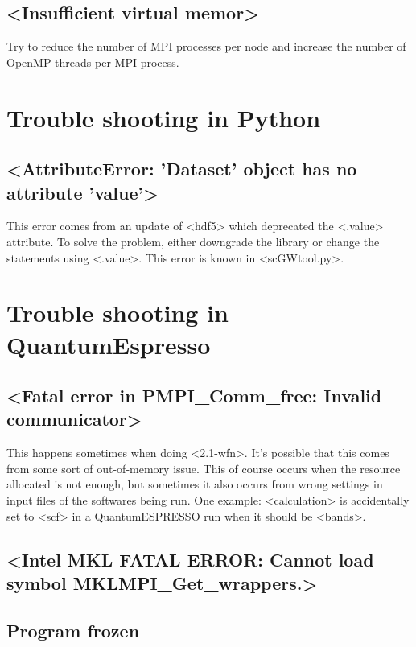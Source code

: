 \documentclass[hyperref, a4paper, 12pt]{report}
\def\texttt#1{<#1>}%
\newcommand{\shortcode}[1]{\texttt{#1}}
\begin{document}
\subsection{\shortcode{Insufficient virtual memor}}

Try to reduce the number of MPI processes per node 
and increase the number of OpenMP threads per MPI process.


\section{Trouble shooting in Python}

\subsection{\shortcode{AttributeError: 'Dataset' object has no attribute 'value'}}

This error comes from an update of \shortcode{hdf5} 
which deprecated the \shortcode{.value} attribute.
To solve the problem, 
either downgrade the library 
or change the statements using \shortcode{.value}.
This error is known in \shortcode{scGWtool.py}.

\section{Trouble shooting in QuantumEspresso}

\subsection{\shortcode{Fatal error in PMPI_Comm_free: Invalid communicator}}

This happens sometimes when doing \shortcode{2.1-wfn}.
It's possible that this comes from some sort of out-of-memory issue.
This of course occurs when the resource allocated is not enough,
but sometimes it also occurs from wrong settings in input files of the softwares being run.
One example: \shortcode{calculation} is accidentally set to \shortcode{scf} 
in a QuantumESPRESSO run when it should be \shortcode{bands}.

\subsection{\shortcode{Intel MKL FATAL ERROR: Cannot load symbol MKLMPI_Get_wrappers.}}



\subsection{Program frozen}
\end{document}
